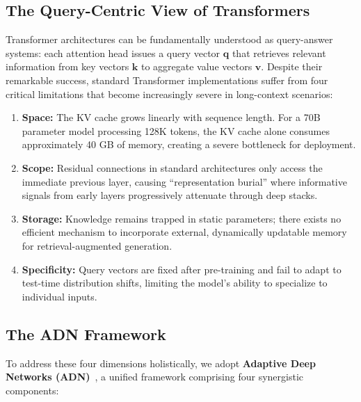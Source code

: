 \documentclass[twocolumn]{article}
\begin{document}
\subsection{The Query-Centric View of Transformers}

Transformer architectures can be fundamentally understood as query-answer systems: each attention head issues a query vector $\mathbf{q}$ that retrieves relevant information from key vectors $\mathbf{k}$ to aggregate value vectors $\mathbf{v}$.
Despite their remarkable success, standard Transformer implementations suffer from four critical limitations that become increasingly severe in long-context scenarios:

\begin{enumerate}
    \item \textbf{Space:} The KV cache grows linearly with sequence length. For a 70B parameter model processing 128K tokens, the KV cache alone consumes approximately 40 GB of memory, creating a severe bottleneck for deployment.
    
    \item \textbf{Scope:} Residual connections in standard architectures only access the immediate previous layer, causing ``representation burial'' where informative signals from early layers progressively attenuate through deep stacks.
    
    \item \textbf{Storage:} Knowledge remains trapped in static parameters; there exists no efficient mechanism to incorporate external, dynamically updatable memory for retrieval-augmented generation.
    
    \item \textbf{Specificity:} Query vectors are fixed after pre-training and fail to adapt to test-time distribution shifts, limiting the model's ability to specialize to individual inputs.
\end{enumerate}

\subsection{The ADN Framework}

To address these four dimensions holistically, we adopt \textbf{Adaptive Deep Networks (ADN)}~\cite{adn}, a unified framework comprising four synergistic components:
\end{document}
